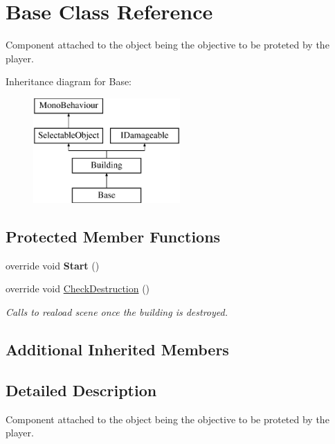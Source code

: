 \hypertarget{class_base}{}\section{Base Class Reference}
\label{class_base}


Component attached to the object being the objective to be proteted by the player.  


Inheritance diagram for Base\+:\begin{figure}[H]
\begin{center}
\leavevmode
\includegraphics[height=4.000000cm]{class_base}
\end{center}
\end{figure}
\subsection*{Protected Member Functions}
\begin{DoxyCompactItemize}
\item 
\mbox{\label{class_base_ae6808f84421a49085cebd457c6d324f4}} 
override void {\bfseries Start} ()
\item 
override void \mbox{\hyperlink{class_base_a4e6f54bb492b4bf669ebb274cc978d35}{Check\+Destruction}} ()
\begin{DoxyCompactList}\small\item\em Calls to reaload scene once the building is destroyed. \end{DoxyCompactList}\end{DoxyCompactItemize}
\subsection*{Additional Inherited Members}


\subsection{Detailed Description}
Component attached to the object being the objective to be proteted by the player. 



